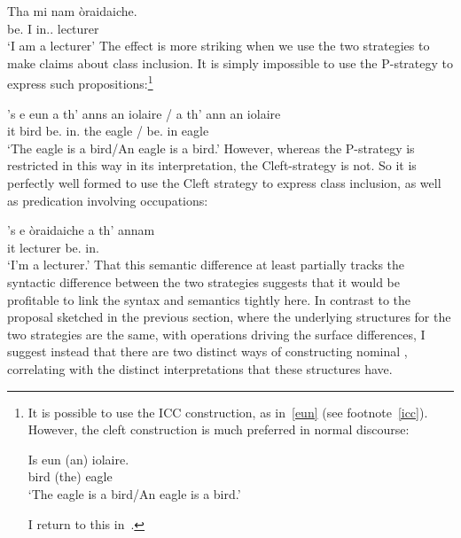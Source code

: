 \documentclass[output=paper]{langsci/langscibook}
\begin{document}
\ea {}
\sn \gll Tha mi nam \`oraidaiche.\\
be.\Prs{} I in.\Poss.\Fsg{} lecturer\\
\glt \enquote*{I am a lecturer}
\z
The effect is more striking when we use the two strategies to make claims about
class inclusion. It is simply impossible to use the P-strategy to express such
propositions:\footnote{\label{generic}It is possible to use the ICC
    construction, as in~\eqref{eun} (see footnote~\eqref{icc}). However, the
    cleft construction is much preferred in normal discourse:

\begin{exe}\label{eun}
 
\sn \gll Is eun (an) iolaire.\\
\Cop{} bird (the) eagle\\
\glt \enquote*{The eagle is a bird/An eagle is a bird.}
\end{exe}
I return to this in~.}

\ea {}
\z

\ea {}
\sn \gll  's e eun a th' anns  an iolaire / a th' {ann an} iolaire\\
\Cop{} it bird \Rel{} be.\Prs{} in.\Def{} the eagle / \Rel{} be.\Prs{} in eagle\\
\glt \enquote*{The eagle is a bird/An eagle is a bird.}
\z
However, whereas the P-strategy is restricted in this way in its
interpretation, the Cleft-strategy is not. So it is perfectly well formed to
use the Cleft strategy to express class inclusion, as well as predication
involving occupations:

\ea {}
\sn \gll 's e \`oraidaiche a th' annam\\
 \Cop{} it lecturer \Rel{} be.\Prs{} in.\Fsg{}\\
\glt \enquote*{I'm a lecturer.}
\z
That this semantic difference at least partially tracks the syntactic
difference between the two strategies suggests that it would be profitable to
link the syntax and semantics tightly here. In contrast to the proposal
sketched in the previous section, where the underlying structures for the two
strategies are the same, with  operations driving the surface
differences, I suggest instead  that there are two distinct ways of
constructing nominal , correlating with the distinct interpretations
that these structures have.\newpage
\end{document}
